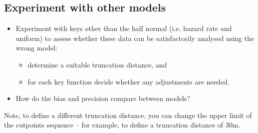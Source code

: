 \documentclass[a4paper]{article}
\begin{document}
\subsection{Experiment with other models}
\begin{itemize}
	\item Experiment with keys other than the half normal (i.e. hazard rate and uniform) to assess whether these data can be satisfactorily analysed using the wrong model:
		\begin{itemize}
		  \item determine a suitable truncation distance, and
		  \item for each key function decide whether any adjustments are needed.
		\end{itemize}
	\item How do the bias and precision compare between models?
\end{itemize}

Note, to define a different truncation distance, you can change the upper limit of the cutpoints sequence – for example, to define a truncation distance of 30m.
\end{document}
